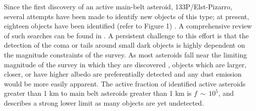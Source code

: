 \documentclass[iop,apj]{emulateapj}
\begin{document}



Since the first discovery of an active main-belt asteroid, 133P/Elst-Pizarro, several attempts have been made to identify new objects of this type; at present, eighteen objects have been identified (refer to Figure 1)  \citep{jewitt15}. A comprehensive review of such searches can be found in \citet{hsieh15}.  A persistent challenge to this effort is that the detection of the coma or tails around small dark objects is highly dependent on the magnitude constraints of the survey. As most asteroids fall near the limiting magnitude of the survey in which they are discovered \citep{jewitt15}%
, objects which are larger, closer, or have higher albedo are preferentially detected and any dust emission would be more easily apparent. The active fraction of identified active asteroids greater than 1 km to main belt asteroids greater than 1 km is $f \, \sim \, 10^5$, and describes a strong lower limit as many objects are yet undetected. \citep{jewitt15} %
\end{document}
